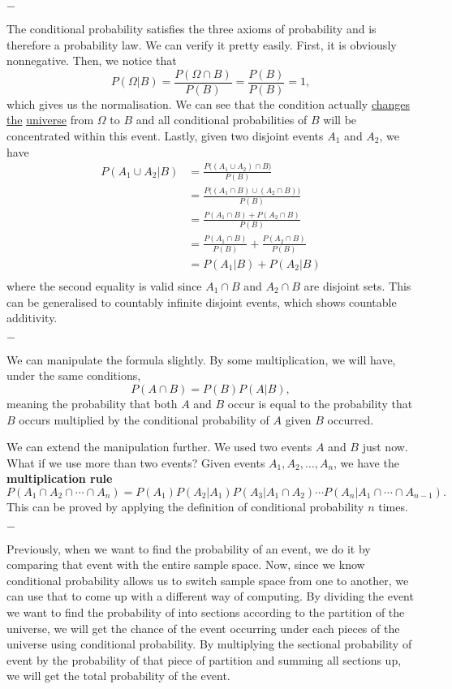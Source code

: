 \documentclass[11pt, a4paper, oneside]{book}
\theoremstyle{definition}
\newcommand{\breaking}{%
    \begin{center}
    $-$
    \end{center}%
}
\begin{document}
\breaking 

\noindent The conditional probability satisfies the three axioms of probability and is therefore a probability law. We can verify it pretty easily. First, it is obviously nonnegative. Then, we notice that\[
P(\Omega | B) = \frac{P(\Omega \cap B)}{P(B)} = \frac{P(B)}{P(B)} = 1, 
\]
which gives us the normalisation. We can see that the condition actually \underline{changes the} \underline{universe} from $\Omega$ to $B$ and all conditional probabilities of $B$ will be concentrated within this event. Lastly, given two disjoint events $A_1$ and $A_2$, we have 
\begin{equation*}
\begin{split}
P(A_1 \cup A_2 | B) &= \frac{P\big((A_1 \cup A_2) \cap B\big)}{P(B)} \\
&= \frac{P\big((A_1 \cap B) \cup (A_2 \cap B)\big)}{P(B)} \\
&= \frac{P(A_1 \cap B) + P(A_2 \cap B)}{P(B)} \\
&= \frac{P(A_1 \cap B)}{P(B)} + \frac{P(A_2 \cap B)}{P(B)} \\
&= P(A_1| B) +P(A_2| B) \\
\end{split}
\end{equation*}
where the second equality is valid since $A_1 \cap B$ and $A_2 \cap B$ are disjoint sets. This can be generalised to countably infinite disjoint events, which shows countable additivity.

\breaking

\noindent We can manipulate the formula slightly. By some multiplication, we will have, under the same conditions, \[
P(A \cap B)=P(B)P(A|B),
\]
meaning the probability that both $A$ and $B$ occur is equal to the probability that $B$ occurs multiplied by the conditional probability of $A$ given $B$ occurred. 

\noindent We can extend the manipulation further. We used two events $A$ and $B$ just now. What if we use more than two events? Given events $A_1, A_2, \dots, A_n$, we have the \textbf{multiplication rule} \[
P(A_1 \cap A_2 \cap \cdots \cap A_n)=P(A_1)P(A_2|A_1)P(A_3|A_1\cap A_2)\cdots P(A_n|A_1 \cap \cdots \cap A_{n-1}).
\] 
This can be proved by applying the definition of conditional probability $n$ times. 

\breaking

\noindent Previously, when we want to find the probability of an event, we do it by comparing that event with the entire sample space. Now, since we know conditional probability allows us to switch sample space from one to another, we can use that to come up with a different way of computing. By dividing the event we want to find the probability of into sections according to the partition of the universe, we will get the chance of the event occurring under each pieces of the universe using conditional probability. By multiplying the sectional probability of event by the probability of that piece of partition and summing all sections up, we will get the total probability of the event. 
\end{document}
